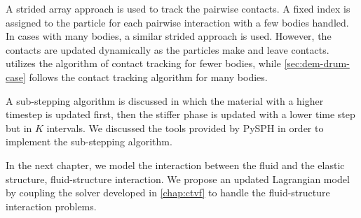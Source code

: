 A strided array approach is used to track the pairwise contacts. A fixed index
is assigned to the particle for each pairwise interaction with a few bodies
handled. In cases with many bodies, a similar strided approach is used. However,
the contacts are updated dynamically as the particles make and leave contacts.
 utilizes the algorithm of contact tracking for
fewer bodies, while \cref{sec:dem-drum-case} follows the contact tracking
algorithm for many bodies.

A sub-stepping algorithm is discussed in which the material with a higher
timestep is updated first, then the stiffer phase is updated with a lower time
step but in $K$ intervals. We discussed the tools provided by PySPH in order to
implement the sub-stepping algorithm.

In the next chapter, we model the interaction between the fluid and the elastic
structure, fluid-structure interaction. We propose an updated Lagrangian model
by coupling the solver developed in \cref{chap:ctvf} to handle the
fluid-structure interaction problems.
